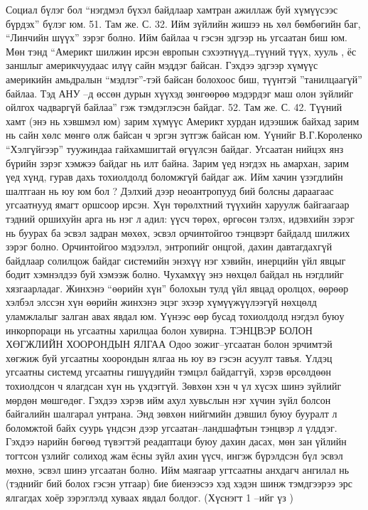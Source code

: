 Социал бүлэг бол “нэгдмэл бүхэл байдлаар хамтран ажиллаж буй хүмүүсээс бүрдэх” бүлэг юм. 51. Там же. С. 32. Ийм зүйлийн жишээ нь хөл бөмбөгийн баг, “Линчийн шүүх” зэрэг болно. Ийм байлаа ч гэсэн эдгээр нь угсаатан биш юм. Мөн тэнд “Америкт шилжин ирсэн европын сэхээтнүүд…түүний түүх, хууль , ёс заншлыг америкчуудаас илүү сайн мэддэг байсан. Гэхдээ эдгээр хүмүүс америкийн амьдралын “мэдлэг”-тэй байсан болохоос биш, түүнтэй ”танилцаагүй” байлаа. Тэд АНУ –д өссөн дурын хүүхэд зөнгөөрөө мэдэрдэг маш олон зүйлийг ойлгох чадваргүй байлаа” гэж тэмдэглэсэн байдаг. 52. Там же. С. 42.
Түүний хамт (энэ нь хэвшмэл юм) зарим хүмүүс Америкт хурдан идээшиж байхад зарим нь сайн хөлс мөнгө олж байсан ч эргэн зүтгэж байсан юм. Үүнийг В.Г.Короленко “Хэлгүйгээр” туужиндаа гайхамшигтай өгүүлсэн байдаг.
Угсаатан нийцэх янз бүрийн зэрэг хэмжээ байдаг нь илт байна. Зарим үед нэгдэх нь амархан, зарим үед хүнд, гурав дахь тохиолдолд боломжгүй байдаг аж. Ийм хачин үзэгдлийн шалтгаан нь юу юм бол ?
Дэлхий дээр неоантропууд бий болсны дараагаас угсаатнууд ямагт оршсоор ирсэн. Хүн төрөлхтний түүхийн харуулж байгаагаар тэдний оршихуйн арга нь нэг л адил: үүсч төрөх, өргөсөн тэлэх, идэвхийн зэрэг нь буурах ба эсвэл задран мөхөх, эсвэл орчинтойгоо тэнцвэрт байдалд шилжих зэрэг болно. Орчинтойгоо мэдээлэл, энтропийг онцгой, дахин давтагдахгүй байдлаар солилцож байдаг системийн энэхүү нэг хэвийн, инерцийн үйл явцыг бодит хэмнэлдээ буй хэмээж болно. Чухамхүү энэ нөхцөл байдал нь нэгдлийг хязгаарладаг. Жинхэнэ “өөрийн хүн” болохын тулд үйл явцад оролцох, өөрөөр хэлбэл элссэн хүн өөрийн жинхэнэ эцэг эхээр хүмүүжүүлээгүй нөхцөлд уламжлалыг залган авах явдал юм. Үүнээс өөр бусад тохиолдолд нэгдэл буюу инкорпораци нь угсаатны харилцаа болон хувирна.
ТЭНЦВЭР БОЛОН ХӨГЖЛИЙН ХООРОНДЫН ЯЛГАА
Одоо зожиг–угсаатан болон эрчимтэй хөгжиж буй угсаатны хоорондын ялгаа нь юу вэ гэсэн асуулт тавъя. Үлдэц угсаатны системд угсаатны гишүүдийн тэмцэл байдаггүй, хэрэв өрсөлдөөн тохиолдсон ч ялагдсан хүн нь үхдэггүй. Зөвхөн хэн ч үл хүсэх шинэ зүйлийг мөрдөн мөшгөдөг. Гэхдээ хэрэв ийм ахул хувьслын нэг хүчин зүйл болсон байгалийн шалгарал унтрана. Энд зөвхөн нийгмийн дэвшил буюу бууралт л боломжтой байх суурь үндсэн дээр угсаатан–ландшафтын тэнцвэр л үлддэг. Гэхдээ нарийн бөгөөд түвэгтэй реадаптаци буюу дахин дасах, мөн зан үйлийн тогтсон үзлийг солиход жам ёсны зүйл ахин үүсч, ингэж бүрэлдсэн бүл эсвэл мөхнө, эсвэл шинэ угсаатан болно.
Ийм маягаар угтсаатны анхдагч ангилал нь (тэднийг бий болох гэсэн утгаар) бие биенээсээ хэд хэдэн шинж тэмдгээрээ эрс ялгагдах хоёр зэрэглэлд хуваах явдал болдог. (Хүснэгт 1 –ийг үз )

